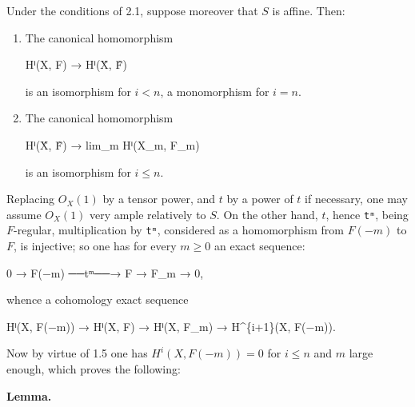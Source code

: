 \documentclass[
  11pt,
  a4paper,
]{book}
\newenvironment{Shaded}{}{}
\newcommand{\NormalTok}[1]{#1}
\begin{document}
Under the conditions of 2.1, suppose moreover that \(S\) is affine.
Then:

\begin{enumerate}
\def\labelenumi{\arabic{enumi}.}
\item
  The canonical homomorphism

\begin{Shaded}
\begin{Highlighting}[]
\NormalTok{Hⁱ(X, F) → Hⁱ(X̂, F̂)}
\end{Highlighting}
\end{Shaded}

  is an isomorphism for \(i < n\), a monomorphism for \(i = n\).
\item
  The canonical homomorphism

\begin{Shaded}
\begin{Highlighting}[]
\NormalTok{Hⁱ(X̂, F̂) → lim\_m Hⁱ(X\_m, F\_m)}
\end{Highlighting}
\end{Shaded}

  is an isomorphism for \(i \leqslant n\).
\end{enumerate}

Replacing \(O_{X}(1)\) by a tensor power, and \(t\) by a power of \(t\)
if necessary, one may assume \(O_{X}(1)\) very ample relatively to
\(S\). On the other hand, \(t\), hence \texttt{tᵐ}, being \(F\)-regular,
multiplication by \texttt{tᵐ}, considered as a homomorphism from
\(F(-m)\) to \(F\), is injective; so one has for every \(m \geqslant 0\)
an exact sequence:

\begin{Shaded}
\begin{Highlighting}[]
\NormalTok{0 → F(−m) ──tᵐ──→ F → F\_m → 0,}
\end{Highlighting}
\end{Shaded}

whence a cohomology exact sequence

\begin{Shaded}
\begin{Highlighting}[]
\NormalTok{Hⁱ(X, F(−m)) → Hⁱ(X, F) → Hⁱ(X, F\_m) → H\^{}\{i+1\}(X, F(−m)).}
\end{Highlighting}
\end{Shaded}

Now by virtue of 1.5 one has \(H^{i}(X, F(-m)) = 0\) for
\(i \leqslant n\) and \(m\) large enough, which proves the following:

\textbf{Lemma.}
\end{document}
